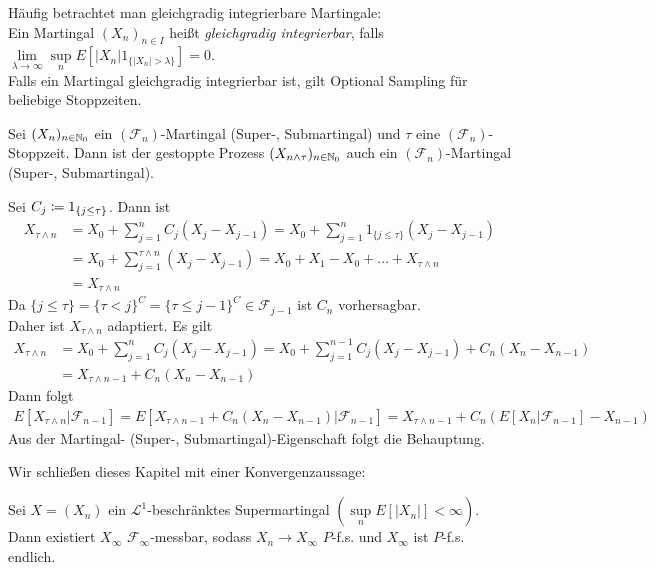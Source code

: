 \documentclass[a4paper,twoside,DIV15,BCOR12mm]{scrbook}
\newcommand{\cF}{\mathcal F}
\begin{document}
\begin{bemerkung}
Häufig betrachtet man gleichgradig integrierbare Martingale:\\
Ein Martingal $(X_n)_{n\in I}$ heißt \textit{gleichgradig integrierbar}, falls $\lim\limits_{\lambda\to\infty}\sup\limits_n E[|X_n| 1_{\{|X_n|>\lambda\}}]=0$.\\
Falls ein Martingal gleichgradig integrierbar ist, gilt Optional Sampling für beliebige Stoppzeiten.
\end{bemerkung}

\begin{satz}
\label{satz:2.1.35}Sei $(X_n)_{n\in\mathbb{N}_0}$ ein $(\cF_n)$-Martingal (Super-, Submartingal) und $\tau$ eine $(\cF_n)$-Stoppzeit. Dann ist der gestoppte Prozess $(X_{n\wedge\tau})_{n\in\mathbb{N}_0}$ auch ein $(\cF_n)$-Martingal (Super-, Submartingal).
\end{satz}
\begin{beweis}
Sei $C_j\da 1_{\{j\leq \tau\}}$. Dann ist
\begin{align*}
X_{\tau\wedge n}&=X_0+\sum\limits_{j=1}^n C_j (X_j-X_{j-1})=X_0+\sum\limits_{j=1}^n1_{\{j\leq\tau\}}(X_j-X_{j-1})\\
&=X_0+\sum\limits_{j=1}^{\tau\wedge n}(X_j-X_{j-1})=X_0+X_1-X_0+\ldots+X_{\tau\wedge n}\\
&= X_{\tau\wedge n}
\end{align*}
Da $\{j\leq\tau\}=\{\tau<j\}^C=\{\tau\leq j-1\}^C \in \cF_{j-1}$ ist $C_n$ vorhersagbar.\\
Daher ist $X_{\tau\wedge n}$ adaptiert. Es gilt
\begin{align*}
X_{\tau\wedge n}&=X_0+\sum\limits_{j=1}^n C_j (X_j-X_{j-1})=X_0+\sum\limits_{j=1}^{n-1}C_j(X_j-X_{j-1})+C_n(X_n-X_{n-1})\\
&= X_{\tau\wedge n-1}+C_n(X_n-X_{n-1})
\end{align*}
Dann folgt 
\begin{align*}
E[X_{\tau\wedge n}|\cF_{n-1}]=E[X_{\tau\wedge n-1}+C_n(X_n-X_{n-1})|\cF_{n-1}]=X_{\tau\wedge n-1}+C_n(E[X_n|\cF_{n-1}]-X_{n-1})
\end{align*}
Aus der Martingal- (Super-, Submartingal)-Eigenschaft folgt die Behauptung.
\end{beweis}

Wir schließen dieses Kapitel mit einer Konvergenzaussage:
\begin{satz}Sei $X=(X_n)$ ein $\mathcal{L}^1$-beschränktes Supermartingal $(\sup\limits_n E[|X_n|]<\infty)$. Dann existiert $X_\infty$ $\cF_\infty$-messbar, sodass $X_n\to X_\infty$ $P$-f.s. und $X_\infty$ ist $P$-f.s. endlich.
\end{satz}
\end{document}
